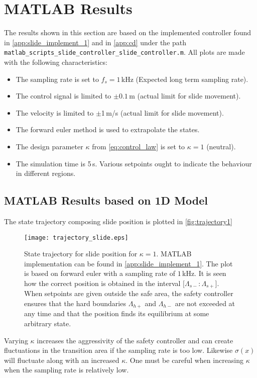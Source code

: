 \section{MATLAB Results}
The results shown in this section are based on the implemented controller found in \autoref{app:slide_implement_1} and in \autoref{app:cd} under the path \texttt{matlab\_scripts\_slide\_controller\_slide\_controller.m}. All plots are made with the following characteristics:
\begin{itemize}
\item The sampling rate is set to $f_s = 1\,$kHz (Expected long term sampling rate).
\item The control signal is limited to $\pm 0.1$\,m (actual limit for slide movement).
\item The velocity is limited to $\pm$1\,m/s (actual limit for slide movement).
\item The forward euler method is used to extrapolate the states.
\item The design parameter $\kappa$ from \autoref{eq:control_law} is set to $\kappa=1$ (neutral).
\item The simulation time is 5\,s. Various setpoints ought to indicate the behaviour in different regions.
\end{itemize}
\subsection{MATLAB Results based on 1D Model}
The state trajectory composing slide position is plotted in \autoref{fig:trajectory1}
\begin{figure}[H]
	\center
		\texttt{[image: trajectory\_slide.eps]}
	\caption{State trajectory for slide position for $\kappa=1$. MATLAB implementation can be found in \autoref{app:slide_implement_1}. The plot is based on forward euler with a sampling rate of $1\,$kHz. It is seen how the correct position is obtained in the interval $[\Lambda_{s-}:\Lambda_{s+}$]. When setpoints are given outside the safe area, the safety controller ensures that the hard boundaries $\Lambda_{h+}$ and $\Lambda_{h-}$ are not exceeded at any time and that the position finds its equilibrium at some arbitrary state.}
	\label{fig:trajectory1}
\end{figure}
Varying $\kappa$ increases the aggressivity of the safety controller and can create fluctuations in the transition area if the sampling rate is too low. Likewise $\sigma(x)$ will fluctuate along with an increased $\kappa$. One must be careful when increasing $\kappa$ when the sampling rate is relatively low. %

